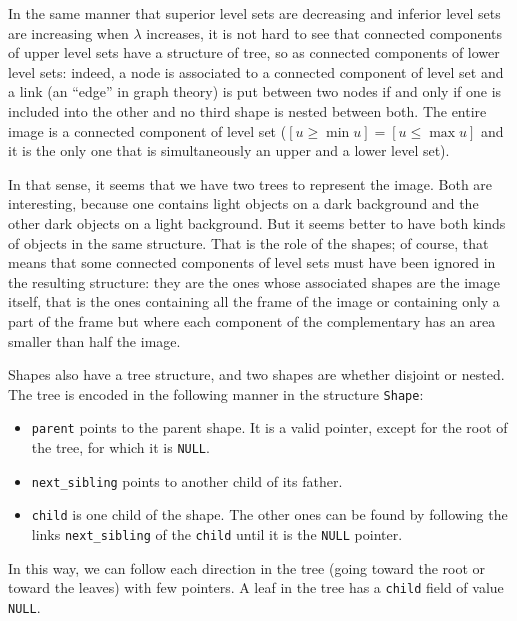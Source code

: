 In the same manner that superior level sets are decreasing and inferior level
sets are increasing when $\lambda$ increases, it is not hard to see that
connected components of upper level sets have a structure of tree, so as
connected components of lower level sets: indeed, a node is associated to
a connected component of level set and a link (an ``edge'' in graph theory)
is put between two nodes if and only if one is included into the other and
no third shape is nested between both. The entire image is a connected
component of level set ($[u\geq \min u] = [u \leq \max u]$ and it is the only
one that is simultaneously an upper and a lower level set).

In that sense, it seems that we
have two trees to represent the image. Both are interesting, because one
contains light objects on a dark background and the other dark objects on
a light background. But it seems better to have both kinds of objects in
the same structure. That is the role of the shapes; of course, that means that
some connected components of level sets must have been ignored in the
resulting structure: they are the ones whose associated shapes are the image
itself, that is the ones containing all the frame of the image or containing
only a part of the frame but where each component of the complementary has
an area smaller than half the image.

Shapes also have a tree structure, and two shapes are whether disjoint or
nested. The tree is encoded in the following manner in the structure
\texttt{Shape}:
\begin{itemize}
\item \texttt{parent} points to the parent shape. It is a valid pointer,
except for the root of the tree, for which it is \texttt{NULL}.
\item \texttt{next\_sibling} points to another child of its father.
\item \texttt{child} is one child of the shape. The other ones can be found
by following the links \texttt{next\_sibling} of the \texttt{child} until it is
the \texttt{NULL} pointer.
\end{itemize}
In this way, we can follow each direction in the tree (going toward the
root or toward the leaves) with few pointers. A leaf in the tree has a
\texttt{child} field of value \texttt{NULL}.

